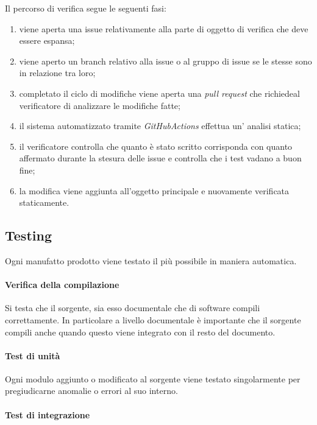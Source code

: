 Il percorso di verifica segue le seguenti fasi:

\begin{enumerate}
    \item viene aperta una issue relativamente alla parte di oggetto di verifica che deve essere espansa;
    \item viene aperto un branch relativo alla issue o al gruppo di issue se le stesse sono in relazione tra loro;
    \item completato il ciclo di modifiche viene aperta una \textit{pull request} che richiedeal verificatore di analizzare le modifiche fatte;
    \item il sistema automatizzato tramite \textit{GitHubActions} effettua un' analisi statica;
    \item il verificatore controlla che quanto è stato scritto corrisponda con quanto affermato durante la stesura delle issue e controlla che i test vadano a buon fine;
    \item la modifica viene aggiunta all'oggetto principale e nuovamente verificata staticamente.
\end{enumerate}

\subsection{Testing}

Ogni manufatto prodotto viene testato il più possibile in maniera automatica.

\paragraph{Verifica della compilazione} Si testa che il sorgente, sia esso documentale che di software compili correttamente. In particolare a livello documentale è importante che il sorgente compili anche quando questo viene integrato con il resto del documento.

\paragraph{Test di unità}

Ogni modulo aggiunto o modificato al sorgente viene testato singolarmente per pregiudicarne anomalie o errori al suo interno.

\paragraph{Test di integrazione}

